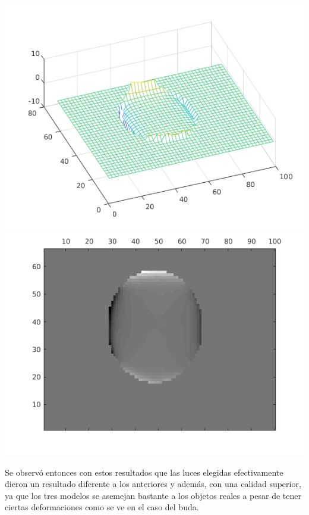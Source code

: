 \begin{center}
\includegraphics[width=.4\linewidth]{imagenes/mate_small_model_1511.png}
\includegraphics[width=.4\linewidth]{imagenes/mate_small_dephs_1511.png}
\end{center}

Se observó entonces con estos resultados que las luces elegidas efectivamente dieron un resultado diferente a los anteriores y además, con una calidad superior, ya que los tres modelos se asemejan bastante a los objetos reales a pesar de tener ciertas deformaciones como se ve en el caso del buda.

